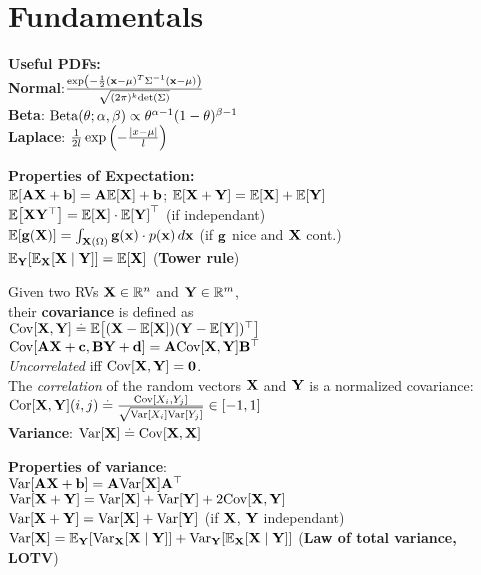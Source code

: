 \section{Fundamentals}
\begin{framed}
    \textbf{Useful PDFs:} \\
    \textbf{Normal}:$\frac{\exp \left(-\frac{1}{2}(\mathbf{x} - \mathbf{\mu})^T \Sigma^{-1} (\mathbf{x} - \mathbf{\mu}) \right)}{\sqrt{(2\pi)^k \mathrm{det}\left(\Sigma\right)}}$ \\
    \textbf{Beta}: $\Beta[\theta]{\alpha}{\beta} \propto \theta^{\alpha-1} (1-\theta)^{\beta-1}$ \\
    \textbf{Laplace}: $\frac{1}{2l}\exp\left(-\frac{\left| x - \mu \right|}{l}\right)$
\end{framed}
\begin{framed}
    \textbf{Properties of Expectation:}\\
    $\E{\mA \rX + \vb} = \mA \E{\rX} + \vb $; $ \E{\rX + \rY} = \E{\rX} + \E{\rY}$ \\
    $\E{\rX\transpose{\rY}} = \E{\rX} \cdot \transpose{\E{\rY}}$ (if independant)\\
    $\E{\vg(\rX)} = \int_{\rX(\Omega)} \vg(\vx) \cdot p(\vx) \,d\vx$ (if $\mathbf{g}$ nice and $\mathbf{X}$ cont.) \\
    $\E[\rY]{\E[\rX]{\rX \mid \rY}} = \E{\rX}$ (\textbf{Tower rule})
\end{framed} 
Given two RVs $\mathbf{X}\in\mathbb{R}^n$ and $\mathbf{Y}\in\mathbb{R}^m$, \\ their \textbf{covariance} is defined as \\
$\Cov{\rX, \rY} \defeq \E{(\rX - \E{\rX})\transpose{(\rY - \E{\rY})}}$ \\
$\Cov{\mA\rX + \vc, \mB\rY + \vd} = \mA\Cov{\rX,\rY}\transpose{\mB}$ \\
\emph{Uncorrelated} iff $\Cov{\rX, \rY} = \mzero$. \\
The \emph{correlation} of the random vectors $\mathbf{X}$ and $\mathbf{Y}$ is a normalized covariance: \\
$\Cor{\rX,\rY}(i,j) \defeq \frac{\Cov{X_i,Y_j}}{\sqrt{\Var{X_i} \Var{Y_j}}} \in [-1,1]$\\
\textbf{Variance}: $\Var{\rX} \defeq \Cov{\rX, \rX}$ \\
\begin{framed}
\textbf{Properties of variance}:\\
$\Var{\mA\rX + \vb} = \mA\Var{\rX}\transpose{\mA}$\\
$\Var{\rX + \rY} = \Var{\rX} + \Var{\rY} + 2 \Cov{\rX, \rY}$\\
$\Var{\rX + \rY} = \Var{\rX} + \Var{\rY}$ (if $\mathbf{X}$, $\mathbf{Y}$ independant)
$\Var{\rX} = \E[\rY]{\Var[\rX]{\rX \mid \rY}} + \Var[\rY]{\E[\rX]{\rX \mid \rY}}$ (\textbf{Law of total variance, LOTV})
\end{framed}
